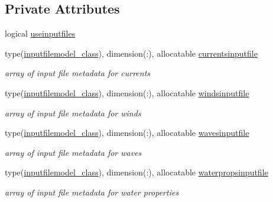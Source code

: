 \subsection*{Private Attributes}
\begin{DoxyCompactItemize}
\item 
logical \mbox{\hyperlink{structsimulationinputstreamer__mod_1_1input__streamer__class_ae5370d8623318a5fc15db31e99cfd148}{useinputfiles}}
\item 
type(\mbox{\hyperlink{structsimulationinputstreamer__mod_1_1inputfilemodel__class}{inputfilemodel\+\_\+class}}), dimension(\+:), allocatable \mbox{\hyperlink{structsimulationinputstreamer__mod_1_1input__streamer__class_aa12635920288984ada44e425ea05bf10}{currentsinputfile}}
\begin{DoxyCompactList}\small\item\em array of input file metadata for currents \end{DoxyCompactList}\item 
type(\mbox{\hyperlink{structsimulationinputstreamer__mod_1_1inputfilemodel__class}{inputfilemodel\+\_\+class}}), dimension(\+:), allocatable \mbox{\hyperlink{structsimulationinputstreamer__mod_1_1input__streamer__class_aff314be52a74d7bfb4db1e3b56c8b539}{windsinputfile}}
\begin{DoxyCompactList}\small\item\em array of input file metadata for winds \end{DoxyCompactList}\item 
type(\mbox{\hyperlink{structsimulationinputstreamer__mod_1_1inputfilemodel__class}{inputfilemodel\+\_\+class}}), dimension(\+:), allocatable \mbox{\hyperlink{structsimulationinputstreamer__mod_1_1input__streamer__class_afaf4ae68e00fdca31e5c59dadd94e05d}{wavesinputfile}}
\begin{DoxyCompactList}\small\item\em array of input file metadata for waves \end{DoxyCompactList}\item 
type(\mbox{\hyperlink{structsimulationinputstreamer__mod_1_1inputfilemodel__class}{inputfilemodel\+\_\+class}}), dimension(\+:), allocatable \mbox{\hyperlink{structsimulationinputstreamer__mod_1_1input__streamer__class_aa11930d0892a06d4d824cac8da9b4026}{waterpropsinputfile}}
\begin{DoxyCompactList}\small\item\em array of input file metadata for water properties \end{DoxyCompactList}\item 

\end{DoxyCompactItemize}
